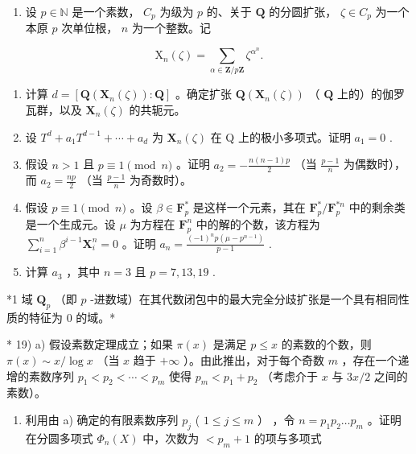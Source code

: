 \begin{enumerate}
\def\labelenumi{\arabic{enumi})}
\setcounter{enumi}{17}
\tightlist
\item
  设 \(p \in \mathbb{N}\) 是一个素数， \(C_p\) 为级为 \(p\) 的、关于 \(\mathbf{Q}\) 的分圆扩张， \(\zeta \in C_p\) 为一个本原 \(p\) 次单位根， \(n\) 为一个整数。记
\end{enumerate}

\[
\mathrm{X} _ {n} (\zeta) = \sum_ {\alpha \in \mathbf {Z} / p \mathbf {Z}} \zeta^ {\alpha^ {n}}.
\]

\begin{enumerate}
\def\labelenumi{\alph{enumi})}
\item
  计算 \(d = [\mathbf{Q}(\mathbf{X}_n(\zeta)) : \mathbf{Q}]\) 。确定扩张 \(\mathbf{Q}(\mathbf{X}_n(\zeta))\) （ \(\mathbf{Q}\) 上的）的伽罗瓦群，以及 \(\mathbf{X}_n(\zeta)\) 的共轭元。
\item
  设 \(T^{d} + a_{1}T^{d-1} + \cdots + a_{d}\) 为 \(\mathbf{X}_{n}(\zeta)\) 在 Q 上的极小多项式。证明 \(a_{1} = 0\) .
\item
  假设 \(n > 1\) 且 \(p \equiv 1 \pmod{n}\) 。证明 \(a_2 = -\frac{n(n - 1)p}{2}\) （当 \(\frac{p - 1}{n}\) 为偶数时），而 \(a_2 = \frac{np}{2}\) （当 \(\frac{p - 1}{n}\) 为奇数时）。
\item
  假设 \(p \equiv 1 \pmod{n}\) 。设 \(\beta \in \mathbf{F}_p^*\) 是这样一个元素，其在 \(\mathbf{F}_p^* / \mathbf{F}_p^{*n}\) 中的剩余类是一个生成元。设 \(\mu\) 为方程在 \(\mathbf{F}_p^n\) 中的解的个数，该方程为 \(\sum_{i=1}^{n} \beta^{i-1} \mathbf{X}_i^n = 0\) 。证明 \(a_n = \frac{(-1)^n p(\mu - p^{n-1})}{p-1}\) .
\item
  计算 \(a_3\) ，其中 \(n = 3\) 且 \(p = 7, 13, 19\) .
\end{enumerate}

*1 域 \(\mathbf{Q}_p\) （即 \(p\) -进数域）在其代数闭包中的最大完全分歧扩张是一个具有相同性质的特征为 0 的域。*

* 19) a) 假设素数定理成立；如果 \(\pi(x)\) 是满足 \(p \leqslant x\) 的素数的个数，则 \(\pi(x) \sim x / \log x\) （当 \(x\) 趋于 \(+\infty\) ）。由此推出，对于每个奇数 \(m\) ，存在一个递增的素数序列 \(p_1 < p_2 < \cdots < p_m\) 使得 \(p_m < p_1 + p_2\) （考虑介于 \(x\) 与 \(3x/2\) 之间的素数）。

\begin{enumerate}
\def\labelenumi{\alph{enumi})}
\setcounter{enumi}{1}
\tightlist
\item
  利用由 a) 确定的有限素数序列 \(p_{j}\) ( \(1 \leq j \leq m\) ） ，令 \(n = p_{1}p_{2} \ldots p_{m}\) 。证明在分圆多项式 \(\Phi_{n}(X)\) 中，次数为 \(< p_{m} + 1\) 的项与多项式
\end{enumerate}

